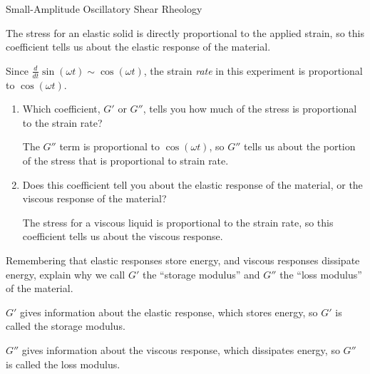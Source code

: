 \begin{activity}[extension]{Small-Amplitude Oscillatory Shear Rheology}
\begin{ctqs}
\begin{enumerate}
					\begin{solution}[1.1in]
						The stress for an elastic solid is directly proportional to the applied strain, so this coefficient tells us about the elastic response of the material.
					\end{solution}
					
			\end{enumerate}
		
		\question Since $\frac{d}{dt}\sin(\omega t) \sim \cos(\omega t)$, the strain \emph{rate} in this experiment is proportional to $\cos(\omega t)$.
		
			\begin{enumerate}
		
				\item Which coefficient, $G'$ or $G''$, tells you how much of the stress is proportional to the strain rate?
	
					\begin{solution}[1.1in]
						The $G''$ term is proportional to $\cos(\omega t)$, so $G''$ tells us about the portion of the stress that is proportional to strain rate.
					\end{solution}
		
				\item Does this coefficient tell you about the elastic response of the material, or the viscous response of the material?
	
					\begin{solution}[1.1in]
					
						The stress for a viscous liquid is proportional to the strain rate, so this coefficient tells us about the viscous response.
					
					\end{solution}
					
			\end{enumerate}
		
		\question Remembering that elastic responses store energy, and viscous responses dissipate energy, explain why we call $G'$ the ``storage modulus'' and $G''$ the ``loss modulus'' of the material.
	
					\begin{solution}[2in]
					
						$G'$ gives information about the elastic response, which stores energy, so $G'$ is called the storage modulus.
						
						$G''$ gives information about the viscous response, which dissipates energy, so $G''$ is called the loss modulus.
					\end{solution}
			

\end{ctqs}
\end{activity}

